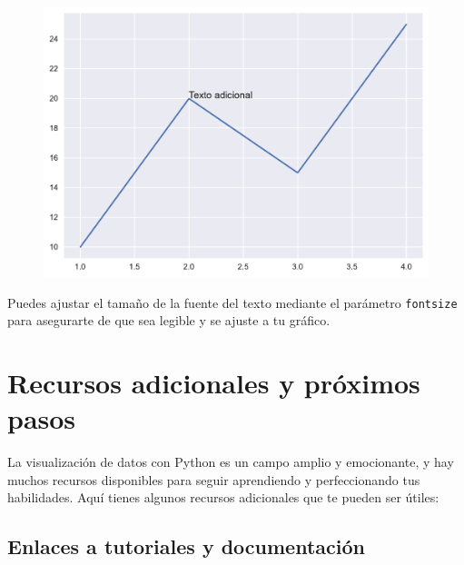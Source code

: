\documentclass[
  a4paper,
]{article}
\begin{document}
\begin{figure}[H]

{\centering \includegraphics{index_files/figure-pdf/cell-14-output-1.pdf}

}

\end{figure}

Puedes ajustar el tamaño de la fuente del texto mediante el parámetro
\texttt{fontsize} para asegurarte de que sea legible y se ajuste a tu
gráfico.

\hypertarget{recursos-adicionales-y-pruxf3ximos-pasos}{%
\section{Recursos adicionales y próximos
pasos}\label{recursos-adicionales-y-pruxf3ximos-pasos}}

La visualización de datos con Python es un campo amplio y emocionante, y
hay muchos recursos disponibles para seguir aprendiendo y perfeccionando
tus habilidades. Aquí tienes algunos recursos adicionales que te pueden
ser útiles:

\hypertarget{enlaces-a-tutoriales-y-documentaciuxf3n}{%
\subsection{Enlaces a tutoriales y
documentación}\label{enlaces-a-tutoriales-y-documentaciuxf3n}}
\end{document}
